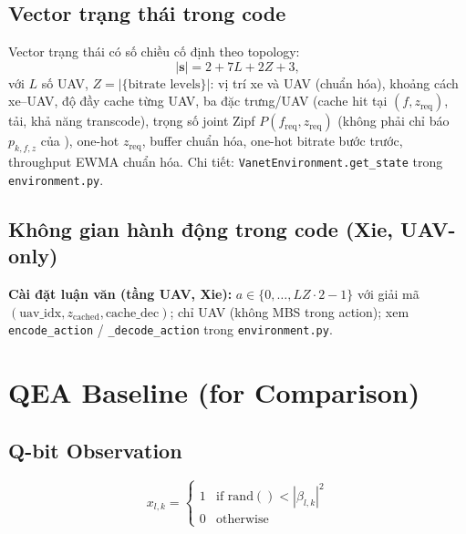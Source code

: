 \documentclass[11pt,a4paper]{article}
\begin{document}
\subsection{Vector trạng thái trong code}
\label{sec:state-impl}

\noindent Vector trạng thái có số chiều cố định theo topology:
\begin{equation}
  |\mathbf{s}| = 2 + 7L + 2Z + 3,
  \tag{impl-state}
\end{equation}
với $L$ số UAV, $Z = |\{\text{bitrate levels}\}|$: vị trí xe và UAV (chuẩn hóa), khoảng cách xe--UAV,
độ đầy cache từng UAV, ba đặc trưng/UAV (cache hit tại $(f,z_{\mathrm{req}})$, tải, khả năng transcode),
trọng số joint Zipf $P(f_{\mathrm{req}},z_{\mathrm{req}})$ (không phải chỉ báo $p_{k,f,z}$ của \cite{Xie}),
one-hot $z_{\mathrm{req}}$, buffer chuẩn hóa, one-hot bitrate bước trước,
throughput EWMA chuẩn hóa. Chi tiết: \texttt{VanetEnvironment.get\_state} trong \texttt{environment.py}.

\subsection{Không gian hành động trong code (Xie, UAV-only)}

\noindent \textbf{Cài đặt luận văn (tầng UAV, Xie):}
$a \in \{0,\ldots, L Z \cdot 2 - 1\}$ với giải mã
$(\mathrm{uav\_idx}, z_{\mathrm{cached}}, \mathrm{cache\_dec})$; chỉ UAV (không MBS trong action);
xem \texttt{encode\_action} / \texttt{\_decode\_action} trong \texttt{environment.py}.

\section{QEA Baseline (for Comparison)}

\subsection{Q-bit Observation}

\begin{equation}
  x_{l,k} = \begin{cases} 1 & \text{if } \mathrm{rand}() < |\beta_{l,k}|^2 \\ 0 & \text{otherwise} \end{cases}
  \tag{Xie~21}
\end{equation}
\end{document}
